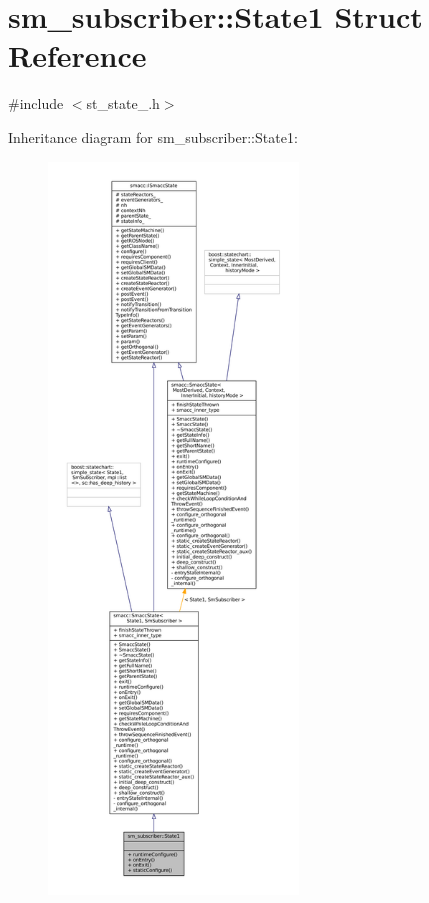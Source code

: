 \hypertarget{structsm__subscriber_1_1State1}{}\section{sm\+\_\+subscriber\+:\+:State1 Struct Reference}
\label{structsm__subscriber_1_1State1}


{\ttfamily \#include $<$st\+\_\+state\+\_.\+h$>$}



Inheritance diagram for sm\+\_\+subscriber\+:\+:State1\+:
\nopagebreak
\begin{figure}[H]
\begin{center}
\leavevmode
\includegraphics[height=550pt]{structsm__subscriber_1_1State1__inherit__graph}
\end{center}
\end{figure}



